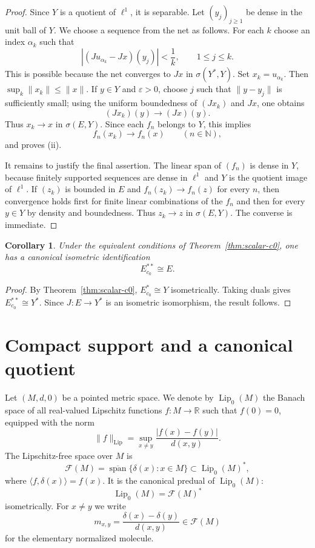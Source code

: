 \documentclass[11pt]{amsart}
\theoremstyle{plain}
\newtheorem{corollary}[theorem]{Corollary}
\theoremstyle{definition}
\theoremstyle{remark}
\newcommand{\Lip}{\operatorname{Lip}}
\newcommand{\F}{\mathcal F}
\newcommand{\N}{\mathbb N}
\newcommand{\R}{\mathbb R}
\begin{document}
\begin{proof}
Since $Y$ is a quotient of $\ell^1$, it is separable. Let $(y_j)_{j\ge1}$
be dense in the unit ball of $Y$. We choose a sequence from the net as
follows. For each $k$ choose an index $\alpha_k$ such that
\[
        |(Ju_{\alpha_k}-Jx)(y_j)|<\frac1k,
        \qquad 1\le j\le k.
\]
This is possible because the net converges to $Jx$ in $\sigma(Y^*,Y)$.
Set $x_k=u_{\alpha_k}$. Then $\sup_k\|x_k\|\le\|x\|$. If $y\in Y$ and
$\varepsilon>0$, choose $j$ such that $\|y-y_j\|$ is sufficiently small;
using the uniform boundedness of $(Jx_k)$ and $Jx$, one obtains
\[
        (Jx_k)(y)\longrightarrow (Jx)(y).
\]
Thus $x_k\to x$ in $\sigma(E,Y)$. Since each $f_n$ belongs to $Y$, this
implies
\[
        f_n(x_k)\longrightarrow f_n(x)\qquad(n\in\N),
\]
and proves \textup{(ii)}.

It remains to justify the final assertion. The linear span of $(f_n)$ is
dense in $Y$, because finitely supported sequences are dense in $\ell^1$ and
$Y$ is the quotient image of $\ell^1$. If $(z_k)$ is bounded in $E$ and
$f_n(z_k)\to f_n(z)$ for every $n$, then convergence holds first for finite
linear combinations of the $f_n$ and then for every $y\in Y$ by density and
boundedness. Thus $z_k\to z$ in $\sigma(E,Y)$. The converse is immediate.
\end{proof}

\begin{corollary}\label{cor:biduality}
Under the equivalent conditions of Theorem~\ref{thm:scalar-c0}, one has a
canonical isometric identification
\[
        E_{c_0}^{**}\cong E.
\]
\end{corollary}

\begin{proof}
By Theorem~\ref{thm:scalar-c0}, $E_{c_0}^*\cong Y$ isometrically. Taking
duals gives $E_{c_0}^{**}\cong Y^*$. Since $J:E\to Y^*$ is an isometric
isomorphism, the result follows.
\end{proof}

\section{Compact support and a canonical quotient}

Let $(M,d,0)$ be a pointed metric space. We denote by $\Lip_0(M)$ the
Banach space of all real-valued Lipschitz functions $f:M\to\R$ such that
$f(0)=0$, equipped with the norm
\[
        \|f\|_{\Lip}=\sup_{x\ne y}\frac{|f(x)-f(y)|}{d(x,y)}.
\]
The Lipschitz-free space over $M$ is
\[
        \F(M)=\overline{\operatorname{span}}\{\delta(x):x\in M\}
        \subset \Lip_0(M)^*,
\]
where $\langle f,\delta(x)\rangle=f(x)$. It is the canonical predual of
$\Lip_0(M)$:
\[
        \Lip_0(M)=\F(M)^*
\]
isometrically. For $x\ne y$ we write
\[
        m_{x,y}=\frac{\delta(x)-\delta(y)}{d(x,y)}\in\F(M)
\]
for the elementary normalized molecule.
\end{document}
